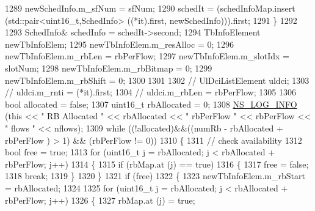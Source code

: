 \begin{DoxyCode}
1289                         newSchedInfo.m\_sfNum = sfNum;
1290                         schedIt = (schedInfoMap.insert (std::pair<uint16\_t,SchedInfo> ((*it).first, 
      newSchedInfo))).first;
1291                 \}
1292 
1293                 SchedInfo& schedInfo = schedIt->second;
1294                 TbInfoElement newTbInfoElem;
1295                 newTbInfoElem.m\_resAlloc = 0;
1296                 newTbInfoElem.m\_rbLen = rbPerFlow;
1297                 newTbInfoElem.m\_slotIdx = slotNum;
1298                 newTbInfoElem.m\_rbBitmap = 0;
1299                 newTbInfoElem.m\_rbShift = 0;
1300 
1301 
1302                 \textcolor{comment}{//                              UlDciListElement uldci;}
1303                 \textcolor{comment}{//                              uldci.m\_rnti = (*it).first;}
1304                 \textcolor{comment}{//                              uldci.m\_rbLen = rbPerFlow;}
1305 
1306                 \textcolor{keywordtype}{bool} allocated = \textcolor{keyword}{false};
1307                 uint16\_t rbAllocated = 0;
1308                 \hyperlink{group__logging_gafbd73ee2cf9f26b319f49086d8e860fb}{NS\_LOG\_INFO} (\textcolor{keyword}{this} << \textcolor{stringliteral}{" RB Allocated "} << rbAllocated << \textcolor{stringliteral}{" rbPerFlow "} << 
      rbPerFlow << \textcolor{stringliteral}{" flows "} << nflows);
1309                 \textcolor{keywordflow}{while} ((!allocated)&&((numRb - rbAllocated + rbPerFlow ) > 1) && (rbPerFlow != 0))
1310                 \{
1311                         \textcolor{comment}{// check availability}
1312                         \textcolor{keywordtype}{bool} free = \textcolor{keyword}{true};
1313                         \textcolor{keywordflow}{for} (uint16\_t j = rbAllocated; j < rbAllocated + rbPerFlow; j++)
1314                         \{
1315                                 \textcolor{keywordflow}{if} (rbMap.at (j) == \textcolor{keyword}{true})
1316                                 \{
1317                                         free = \textcolor{keyword}{false};
1318                                         \textcolor{keywordflow}{break};
1319                                 \}
1320                         \}
1321                         \textcolor{keywordflow}{if} (free)
1322                         \{
1323                                 newTbInfoElem.m\_rbStart = rbAllocated;
1324 
1325                                 \textcolor{keywordflow}{for} (uint16\_t j = rbAllocated; j < rbAllocated + rbPerFlow; j++)
1326                                 \{
1327                                         rbMap.at (j) = \textcolor{keyword}{true};

\end{DoxyCode}
